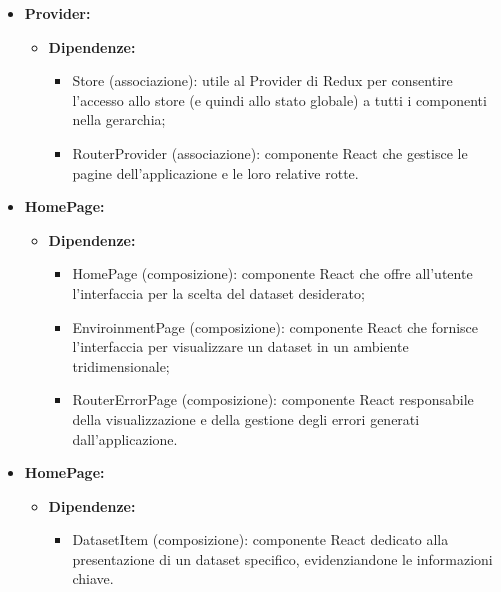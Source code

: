 \begin{itemize}
    \item \textbf{Provider:}
    \begin{itemize}
        \item \textbf{Dipendenze:}
        \begin{itemize}
            \item Store (associazione): utile al Provider di Redux per consentire l'accesso allo store (e quindi allo stato globale) a tutti i componenti nella gerarchia;
            \item RouterProvider (associazione): componente React che gestisce le pagine dell'applicazione e le loro relative rotte.
        \end{itemize} 
    \end{itemize}

    \item \textbf{HomePage:}
    \begin{itemize}
        \item \textbf{Dipendenze:}
        \begin{itemize}
            \item HomePage (composizione): componente React che offre all'utente l'interfaccia per la scelta del dataset desiderato;
            \item EnviroinmentPage (composizione): componente React che fornisce l'interfaccia per visualizzare un dataset in un ambiente tridimensionale;
            \item RouterErrorPage (composizione): componente React responsabile della visualizzazione e della gestione degli errori generati dall'applicazione.
        \end{itemize} 
    \end{itemize}

    \item \textbf{HomePage:}
    \begin{itemize}
        \item \textbf{Dipendenze:}
        \begin{itemize}
            \item DatasetItem (composizione): componente React dedicato alla presentazione di un dataset specifico, evidenziandone le informazioni chiave.
        \end{itemize} 
    \end{itemize}
\end{itemize}

